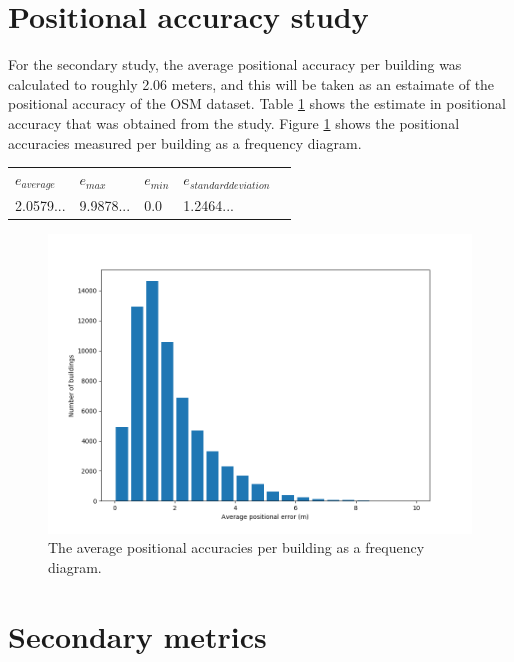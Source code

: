 \documentclass{kththesis}
\begin{document}
\section{Positional accuracy study}

For the secondary study, the average positional accuracy per building was calculated to roughly 2.06 meters, and this will be taken as an estaimate of the positional accuracy of the OSM dataset.
Table \ref{table:positional-accuracy} shows the estimate in positional accuracy that was obtained from the study.
Figure \ref{fig:bar-plot-positional-accuracy} shows the positional accuracies measured per building as a frequency diagram.

\begin{table}[H]
    \begin{tabular}{lllll}
        $e_{average}$ & $e_{max}$ & $e_{min}$ & $e_{standard deviation}$ \\
        2.0579... & 9.9878... & 0.0 & 1.2464...
    \end{tabular}
    \label{table:positional-accuracy}
\end{table}

\begin{figure}[H]
    \centering
    \includegraphics[width=\textwidth,height=0.5\textheight,keepaspectratio]{img_pos_error_plot}
    \caption{The average positional accuracies per building as a frequency diagram.}
    \label{fig:bar-plot-positional-accuracy}
\end{figure}

\section{Secondary metrics}
\end{document}
